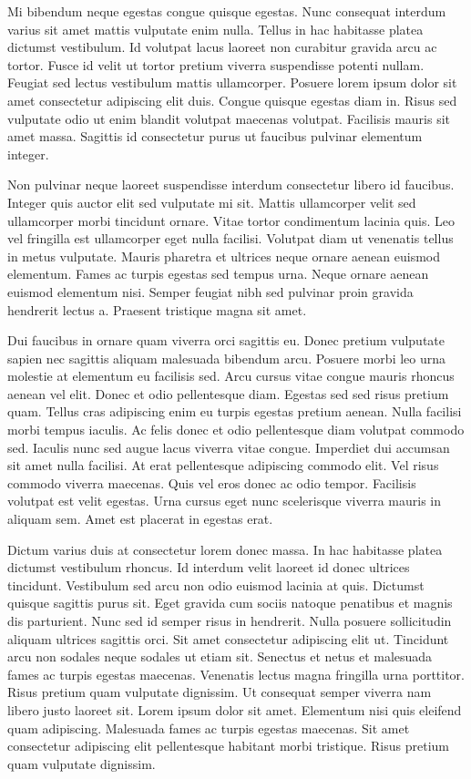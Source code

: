 \documentclass[11pt,a4paper]{article}
\begin{document}
Mi bibendum neque egestas congue quisque egestas. Nunc consequat interdum varius sit amet mattis vulputate enim nulla. Tellus in hac habitasse platea dictumst vestibulum. Id volutpat lacus laoreet non curabitur gravida arcu ac tortor. Fusce id velit ut tortor pretium viverra suspendisse potenti nullam. Feugiat sed lectus vestibulum mattis ullamcorper. Posuere lorem ipsum dolor sit amet consectetur adipiscing elit duis. Congue quisque egestas diam in. Risus sed vulputate odio ut enim blandit volutpat maecenas volutpat. Facilisis mauris sit amet massa. Sagittis id consectetur purus ut faucibus pulvinar elementum integer.

Non pulvinar neque laoreet suspendisse interdum consectetur libero id faucibus. Integer quis auctor elit sed vulputate mi sit. Mattis ullamcorper velit sed ullamcorper morbi tincidunt ornare. Vitae tortor condimentum lacinia quis. Leo vel fringilla est ullamcorper eget nulla facilisi. Volutpat diam ut venenatis tellus in metus vulputate. Mauris pharetra et ultrices neque ornare aenean euismod elementum. Fames ac turpis egestas sed tempus urna. Neque ornare aenean euismod elementum nisi. Semper feugiat nibh sed pulvinar proin gravida hendrerit lectus a. Praesent tristique magna sit amet.

Dui faucibus in ornare quam viverra orci sagittis eu. Donec pretium vulputate sapien nec sagittis aliquam malesuada bibendum arcu. Posuere morbi leo urna molestie at elementum eu facilisis sed. Arcu cursus vitae congue mauris rhoncus aenean vel elit. Donec et odio pellentesque diam. Egestas sed sed risus pretium quam. Tellus cras adipiscing enim eu turpis egestas pretium aenean. Nulla facilisi morbi tempus iaculis. Ac felis donec et odio pellentesque diam volutpat commodo sed. Iaculis nunc sed augue lacus viverra vitae congue. Imperdiet dui accumsan sit amet nulla facilisi. At erat pellentesque adipiscing commodo elit. Vel risus commodo viverra maecenas. Quis vel eros donec ac odio tempor. Facilisis volutpat est velit egestas. Urna cursus eget nunc scelerisque viverra mauris in aliquam sem. Amet est placerat in egestas erat.

Dictum varius duis at consectetur lorem donec massa. In hac habitasse platea dictumst vestibulum rhoncus. Id interdum velit laoreet id donec ultrices tincidunt. Vestibulum sed arcu non odio euismod lacinia at quis. Dictumst quisque sagittis purus sit. Eget gravida cum sociis natoque penatibus et magnis dis parturient. Nunc sed id semper risus in hendrerit. Nulla posuere sollicitudin aliquam ultrices sagittis orci. Sit amet consectetur adipiscing elit ut. Tincidunt arcu non sodales neque sodales ut etiam sit. Senectus et netus et malesuada fames ac turpis egestas maecenas. Venenatis lectus magna fringilla urna porttitor. Risus pretium quam vulputate dignissim. Ut consequat semper viverra nam libero justo laoreet sit. Lorem ipsum dolor sit amet. Elementum nisi quis eleifend quam adipiscing. Malesuada fames ac turpis egestas maecenas. Sit amet consectetur adipiscing elit pellentesque habitant morbi tristique. Risus pretium quam vulputate dignissim.
\end{document}
